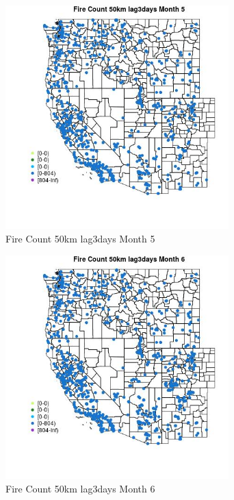 \begin{figure} 
\centering  
\includegraphics[width=0.77\textwidth]{Code_Outputs/Report_ML_input_PM25_Step4_part_f_de_duplicated_aves_prioritize_24hr_obswNAs_MapObsMo5Fire_Count_50km_lag3days.jpg} 
\caption{\label{fig:Report_ML_input_PM25_Step4_part_f_de_duplicated_aves_prioritize_24hr_obswNAsMapObsMo5Fire_Count_50km_lag3days}Fire Count 50km lag3days Month 5} 
\end{figure} 
 

\begin{figure} 
\centering  
\includegraphics[width=0.77\textwidth]{Code_Outputs/Report_ML_input_PM25_Step4_part_f_de_duplicated_aves_prioritize_24hr_obswNAs_MapObsMo6Fire_Count_50km_lag3days.jpg} 
\caption{\label{fig:Report_ML_input_PM25_Step4_part_f_de_duplicated_aves_prioritize_24hr_obswNAsMapObsMo6Fire_Count_50km_lag3days}Fire Count 50km lag3days Month 6} 
\end{figure} 
 


